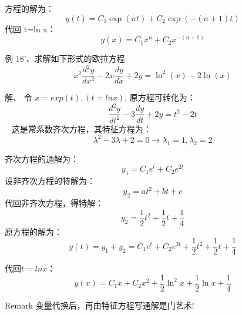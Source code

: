 \begin{frame}  
	方程的解为：
	\begin{equation*}
		y(t)=C_1 \exp (nt) +C_2 \exp (-(n+1) t)
	\end{equation*}  
	代回 t=ln x：
	\begin{equation*}
		y(x)=C_1 x^n +C_2 x^{-(n+1) }
	\end{equation*}   
\end{frame}

\begin{frame}
	\begin{exampleblock} {例 18'、求解如下形式的欧拉方程}
	\begin{equation*}
		x^2 \frac{d^2 y}{d x^2} -2x \frac{d y}{d x} +2y = \ln^2( x) -2 \ln(x) 
	\end{equation*}    
	\end{exampleblock}
	\alert{解、} 	令 $x=exp(t) , (t=ln x) $, 原方程可转化为：
	\begin{equation*}
 		\frac{d^2 y}{d t^2}  -3\frac{dy}{dt} +2 y =t^2 -2t 
 	\end{equation*}    
 	这是常系数齐次方程，其特征方程为：
 	\begin{equation*}
 		\lambda^2  -3\lambda +2  =0  \to  \lambda_1=1,   \lambda_2=2 
 	\end{equation*}   
\end{frame}


\begin{frame}
	齐次方程的通解为：
	\begin{equation*}
		y_1=C_1 e^t +C_2 e^{2t}
	\end{equation*}   
	设非齐次方程的特解为：
	\begin{equation*}
		y_2=a t^2+bt+c
	\end{equation*} 
	代回非齐次方程，得特解：
	\begin{equation*}
		y_2=\frac{1}{2} t^2+\frac{1}{2}t+\frac{1}{4}
	\end{equation*} 
	原方程的解为：
	\begin{equation*}
		y(t)=y_1+y_2=C_1 e^t +C_2 e^{2t}+\frac{1}{2} t^2+\frac{1}{2}t+\frac{1}{4}
	\end{equation*} 
\end{frame}


\begin{frame}
	代回$t=ln x $：
	\begin{equation*}
		y(x)=C_1 x +C_2 x^2+\frac{1}{2} \ln ^2 x+\frac{1}{2}\ln x+\frac{1}{4}
	\end{equation*} 
	\begin{block} {Remark}
		变量代换后，再由特征方程写通解是门艺术!
	\end{block}  
\end{frame}

